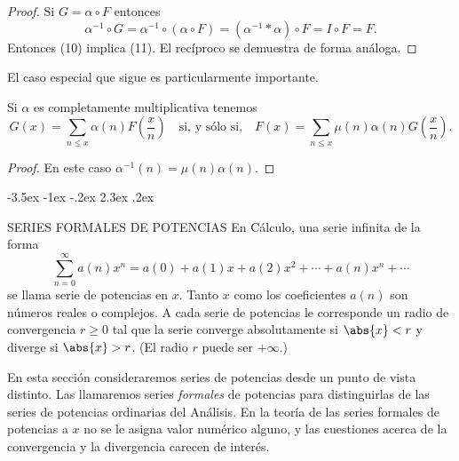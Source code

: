 \documentclass[12pt,a4paper]{book}
\makeatletter
\renewcommand\section{\@startsection{section}{1}{\z@}%
  {-3.5ex \@plus -1ex \@minus -.2ex}%
  {2.3ex \@plus .2ex}%
  {\normalfont\Large\bfseries\raggedright}}
\makeatother
\begin{document}
    \begin{proof}
        Si $G=\alpha\circ F$ entonces
        \begin{equation*}
            \alpha^{-1}\circ G=\alpha^{-1}\circ(\alpha\circ F)=(\alpha^{-1}*\alpha)\circ F
            =I\circ F=F.
        \end{equation*}
        Entonces (10) implica (11). El recíproco se demuestra de forma análoga.
    \end{proof}

    El caso especial que sigue es particularmente importante.

    \begin{teorema}
        Si $\alpha$ es completamente multiplicativa tenemos
        \begin{equation*}
            G(x)=\sum_{n\leq x}\alpha(n)F\left(\frac{x}{n}\right)\quad\text{si, y sólo si,}
            \quad F(x)=\sum_{n\leq x}\mu(n)\alpha(n)G\left(\frac{x}{n}\right).
        \end{equation*}
    \end{teorema}

    \begin{proof}
        En este caso $\alpha^{-1}(n)=\mu(n)\alpha(n)$.
    \end{proof}

    \section{SERIES FORMALES DE POTENCIAS}
    En Cálculo, una serie infinita de la forma
    \begin{equation}
        \sum_{n=0}^{\infty}a(n)x^{n}=a(0)+a(1)x+a(2)x^{2}+\cdots+a(n)x^{n}+\cdots
    \end{equation}
    se llama serie de potencias en $x$. Tanto $x$ como los coeficientes $a(n)$ son números
    reales o complejos. A cada serie de potencias le corresponde un radio de convergencia
    $r\geq0$ tal que la serie converge absolutamente si $\abs{x}<r$ y diverge si
    $\abs{x}>r$. (El radio $r$ puede ser $+\infty$.)

    En esta sección consideraremos series de potencias desde un punto de vista distinto.
    Las llamaremos series \textit{formales} de potencias para distinguirlas de las series
    de potencias ordinarias del Análisis. En la teoría de las series formales de potencias
    a $x$ no se le asigna valor numérico alguno, y las cuestiones acerca de la convergencia
    y la divergencia carecen de interés.
\end{document}
